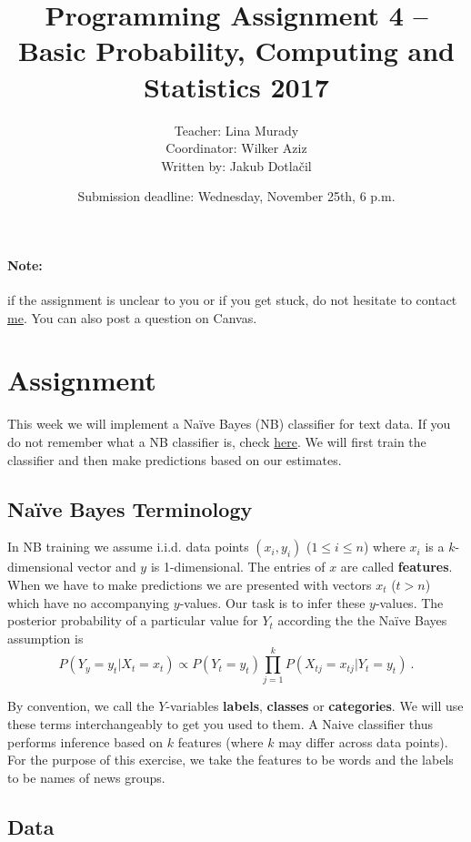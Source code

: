 \documentclass[11pt, a4paper]{article}
\title{Programming Assignment 4 -- Basic Probability, Computing and Statistics 2017}
\author{Teacher: Lina Murady\\
  Coordinator: Wilker Aziz\\
  Written by: Jakub Dotla\v{c}il}
\date{Submission deadline: Wednesday, November 25th, 6 p.m.}
\begin{document}
\maketitle

\paragraph{Note:} if the assignment is unclear to you or if you get stuck, do not hesitate to contact \href{mailto:l.murady@uva.nl}{me}. You can also post a question on Canvas.

\section{Assignment}

This week we will implement a Na\"ive Bayes (NB) classifier for text data. If you do not remember what a 
NB classifier is, check \href{https://github.com/BasicProbability/LectureNotes/blob/master/chapter4/chapter4.pdf}{here}. 
We will first train the classifier and then make predictions based on our estimates.

\subsection{Na\"ive Bayes Terminology}

In NB training we assume i.i.d. data points $ (x_{i},y_{i}) $ ($ 1 \leq i \leq n $) where $ x_{i} $ is a $ k $-dimensional vector and
$ y $ is 1-dimensional. The entries of $ x $ are called \textbf{features}. When we have to make predictions we are presented with vectors
$ x_{t} $ ($ t > n $) which have no accompanying $ y $-values. Our task is to infer these $ y $-values. The posterior probability of a particular value
for $ Y_{t} $ according the the Na\"ive Bayes assumption is
\begin{equation}
P(Y_{y} = y_{t}|X_{t} = x_{t}) \propto P(Y_{t} = y_{t}) \prod_{j=1}^{k}P(X_{tj} = x_{tj}|Y_{t} = y_{t}) \ .
\end{equation}

By convention, we call the $ Y $-variables \textbf{labels}, \textbf{classes} or \textbf{categories}. We will use these terms interchangeably to get you used
to them. A Naive classifier thus performs inference based on $ k $ features (where $ k $ may differ across data points). For the purpose of this exercise, we take the 
features to be words and the labels to be names of news groups.

\subsection{Data}
\end{document}
